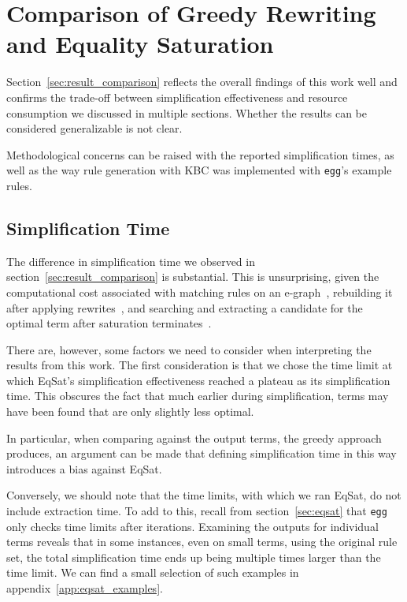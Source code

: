 \section{Comparison of Greedy Rewriting and Equality Saturation}
Section~\ref{sec:result_comparison} reflects the overall findings of this work well and confirms the trade-off between simplification effectiveness and resource consumption we discussed in multiple sections. Whether the results can be considered generalizable is not clear.

Methodological concerns can be raised with the reported simplification times, as well as the way rule generation with KBC was implemented with \texttt{egg}'s example rules.

\subsection{Simplification Time}
\label{sec:discussion_time}
The difference in simplification time we observed in section~\ref{sec:result_comparison} is  substantial. This is unsurprising, given the computational cost associated with matching rules on an e-graph~\citep{Willsey_2022}, rebuilding it after applying rewrites~\citep{Willsey_2021}, and searching and extracting a candidate for the optimal term after saturation terminates~\citep{yin2025eboostboostedegraphextraction}.

There are, however, some factors we need to consider when interpreting the results from this work. The first consideration is that we chose the time limit at which EqSat's simplification effectiveness reached a plateau as its simplification time. This obscures the fact that much earlier during simplification, terms may have been found that are only slightly less optimal.

In particular, when comparing against the output terms, the greedy approach produces, an argument can be made that defining simplification time in this way introduces a bias against EqSat.

Conversely, we should note that the time limits, with which we ran EqSat, do not include extraction time. To add to this, recall from section~\ref{sec:eqsat} that \texttt{egg} only checks time limits after iterations. Examining the outputs for individual terms reveals that in some instances, even on small terms, using the original rule set, the total simplification time ends up being multiple times larger than the time limit. We can find a small selection of such examples in appendix~\ref{app:eqsat_examples}.

